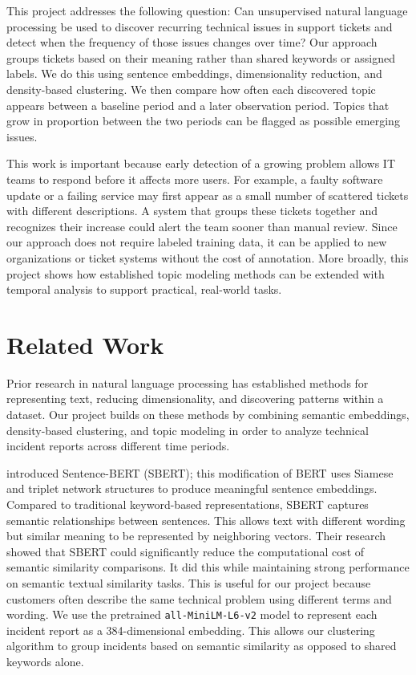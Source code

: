 \documentclass[sigconf,nonacm]{acmart}
\begin{document}
This project addresses the following question: Can unsupervised natural language processing be used to discover recurring technical issues in support tickets and detect when the frequency of those issues changes over time? Our approach groups tickets based on their meaning rather than shared keywords or assigned labels. We do this using sentence embeddings, dimensionality reduction, and density-based clustering. We then compare how often each discovered topic appears between a baseline period and a later observation period. Topics that grow in proportion between the two periods can be flagged as possible emerging issues.

This work is important because early detection of a growing problem allows IT teams to respond before it affects more users. For example, a faulty software update or a failing service may first appear as a small number of scattered tickets with different descriptions. A system that groups these tickets together and recognizes their increase could alert the team sooner than manual review. Since our approach does not require labeled training data, it can be applied to new organizations or ticket systems without the cost of annotation. More broadly, this project shows how established topic modeling methods can be extended with temporal analysis to support practical, real-world tasks.

\section{Related Work}
Prior research in natural language processing has established methods for representing text, reducing dimensionality, and discovering patterns within a dataset. Our project builds on these methods by combining semantic embeddings, density-based clustering, and topic modeling in order to analyze technical incident reports across different time periods.

\citet{reimers2019sentence} introduced Sentence-BERT (SBERT); this modification of BERT uses Siamese and triplet network structures to produce meaningful sentence embeddings. Compared to traditional keyword-based representations, SBERT captures semantic relationships between sentences. This allows text with different wording but similar meaning to be represented by neighboring vectors. Their research showed that SBERT could significantly reduce the computational cost of semantic similarity comparisons. It did this while maintaining strong performance on semantic textual similarity tasks. This is useful for our project because customers often describe the same technical problem using different terms and wording. We use the pretrained \texttt{all-MiniLM-L6-v2} model to represent each incident report as a 384-dimensional embedding. This allows our clustering algorithm to group incidents based on semantic similarity as opposed to shared keywords alone.
\end{document}
